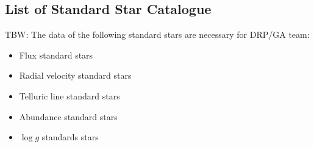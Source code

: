 \subsection{List of Standard Star Catalogue}

TBW:
The data of the following standard stars are necessary for DRP/GA team:
\begin{itemize}
    \item Flux standard stars
    \item Radial velocity standard stars
    \item Telluric line standard stars
    \item Abundance standard stars
    \item $\log g$ standards stars
\end{itemize}

